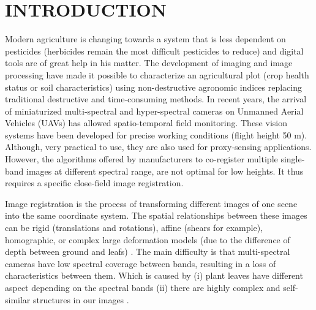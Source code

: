 \documentclass[a4paper,twoside]{article}
\begin{document}
	\onecolumn \maketitle \normalsize \setcounter{footnote}{0} \vfill
	
	\section{\uppercase{Introduction}}
	
	\par Modern agriculture is changing towards a system that is less dependent on pesticides \cite{10.1371/journal.pone.0097922}
	(herbicides remain the most difficult pesticides to reduce) and digital tools are of great help in his matter.
	The development of imaging and image processing have made it possible to characterize an agricultural plot \cite{SANKARAN2015112}
	(crop health status or soil characteristics) using non-destructive agronomic indices \cite{10.1371/journal.pone.0072736}
	replacing traditional destructive and time-consuming methods.
	In recent years, the arrival of miniaturized multi-spectral and hyper-spectral cameras on Unmanned Aerial Vehicles (UAVs)
	has allowed spatio-temporal field monitoring. These vision systems have been developed for precise working conditions (flight height 50 m).
	Although, very practical to use, they are also used for proxy-sensing applications.
	However, the algorithms	offered by manufacturers to co-register multiple single-band images at different spectral range,
	are not optimal for low heights. It thus requires a specific close-field image registration.
	\\
	\par Image registration is the process of transforming different images of one scene into the same coordinate system.
	The spatial relationships between these images can be rigid (translations and rotations), affine (shears for example),
	homographic, or complex large deformation models (due to the difference of depth between ground and leafs) \cite{Kamoun}.
	The main difficulty is that multi-spectral cameras have low spectral coverage between bands, resulting in a loss of characteristics between them.
	Which is caused by (i) plant leaves have different aspect depending on the spectral bands
	(ii) there are highly complex and self-similar structures in our images \cite{douarre:hal-02183837}.
\end{document}
